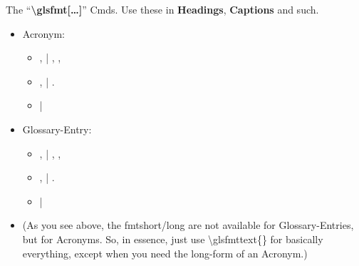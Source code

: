 \npi
The \enquote{\bfseries\textbackslash glsfmt[\ldots]} Cmds. Use these in \textbf{Headings}, \textbf{Captions} and such.
\nl
\begin{itemize}
	\item Acronym:
		\begin{itemize}
			\item {},  | , ,
			\item {},  | .
			\item {} | 
		\end{itemize}
	\item Glossary-Entry:
		\begin{itemize}
			\item {},  | , ,
			\item {},  | .
			\item {} | 
		\end{itemize}
\end{itemize}
\begin{itemize}[labsigA]
	\item (As you see above, the fmtshort/long are not available for Glossary-Entries, but for Acronyms. So, in essence, just use \textbackslash glsfmttext\{\} for basically everything, except when you need the long-form of an Acronym.)
\end{itemize}







